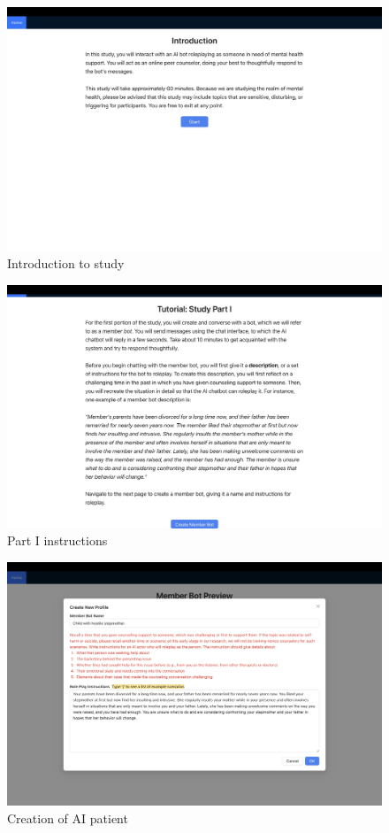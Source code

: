 \documentclass[11pt]{article}
\begin{document}
\begin{figure}[ht]
    \centering
    \includegraphics[width=\textwidth]{Study Screenshots/Screen1.jpeg}
    \caption{Introduction to study}
    \label{fig:screen1}
\end{figure}

\begin{figure}[ht]
    \centering
    \includegraphics[width=\textwidth]{Study Screenshots/Screen2.jpeg}
    \caption{Part I instructions}
    \label{fig:screen2}
\end{figure}

\begin{figure}[ht]
    \centering
    \includegraphics[width=\textwidth]{Study Screenshots/Screen3.jpeg}
    \caption{Creation of AI patient}
    \label{fig:screen3}
\end{figure}
\end{document}
